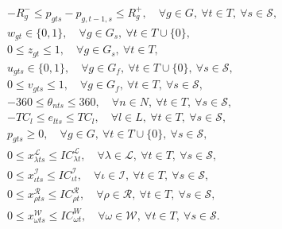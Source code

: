 \begin{subequations}
\begin{align}
	&-R_g^- \le p_{gts}-p_{g,t-1,s} \le R_g^+ ,\quad\forall g\in G,\ \forall t\in T,\ \forall s\in\mathcal{S},\\
	&w_{gt}\in\{0,1\},\quad\forall g\in G_s,\ \forall t\in T\cup\{0\},\\
	& 0\le z_{gt}\le 1,\quad\forall g\in G_s,\ \forall t\in T,\\
	&u_{gts}\in\{0,1\},\quad\forall g\in G_f,\ \forall t\in T\cup\{0\},\ \forall s\in\mathcal{S},\\
	&0\le v_{gts}\le 1,\quad\forall g\in G_f,\ \forall t\in T,\ \forall s\in\mathcal{S},\\
	&-360\le\theta_{nts}\le 360,\quad\forall n\in N,\ \forall t\in T,\ \forall s\in\mathcal{S},\\
	&-TC_l\le e_{lts}\le TC_l,\quad\forall l\in L,\ \forall t\in T,\ \forall s\in\mathcal{S},\\
	&p_{gts}\ge 0,\quad\forall g\in G,\ \forall t\in T\cup\{0\},\ \forall s\in\mathcal{S},\\
	&0\le x_{\lambda ts}^\mathcal{L}\le IC_{\lambda t}^\mathcal{L},\quad\forall \lambda\in \mathcal{L},\ \forall t\in T,\ \forall s\in\mathcal{S},\\
	&0\le x_{\iota ts}^\mathcal{I}\le IC_{\iota t}^\mathcal{I},\quad\forall \iota \in \mathcal{I},\ \forall t\in T,\ \forall s\in\mathcal{S},\\
	&0\le x_{\rho ts}^\mathcal{R} \le IC_{\rho t}^\mathcal{R},\quad\forall \rho\in\mathcal{R},\ \forall t\in T,\ \forall s\in\mathcal{S},\\
	&0\le x_{\omega ts}^\mathcal{W}\le IC_{\omega t}^W,\quad\forall \omega\in\mathcal{W},\ \forall t\in T,\ \forall s\in\mathcal{S}.
	\end{align}	
\end{subequations}

